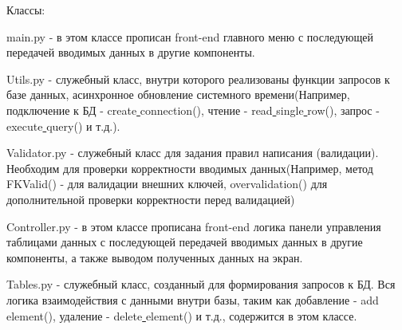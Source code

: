 Классы:

main.py - в этом классе прописан front-end главного меню с последующей передачей вводимых данных в другие компоненты.

Utils.py - служебный класс, внутри которого реализованы функции запросов к базе данных, асинхронное обновление системного времени(Например, подключение к БД - create\underline{ }connection(), чтение - read\underline{ }single\underline{ }row(), запрос - execute\underline{ }query() и т.д.).

Validator.py - служебный класс для задания правил написания (валидации). Необходим для проверки корректности вводимых данных(Например, метод FKValid() - для валидации внешних ключей, overvalidation() для дополнительной проверки корректности перед валидацией)

Controller.py - в этом классе прописана front-end логика панели управления таблицами данных с последующей передачей вводимых данных в другие компоненты, а также выводом полученных данных на экран.

Tables.py - служебный класс, созданный для формирования запросов к БД. Вся логика взаимодействия с данными внутри базы, таким как добавление - add\underline{ }element(), удаление - delete\underline{ }element() и т.д., содержится в этом классе.